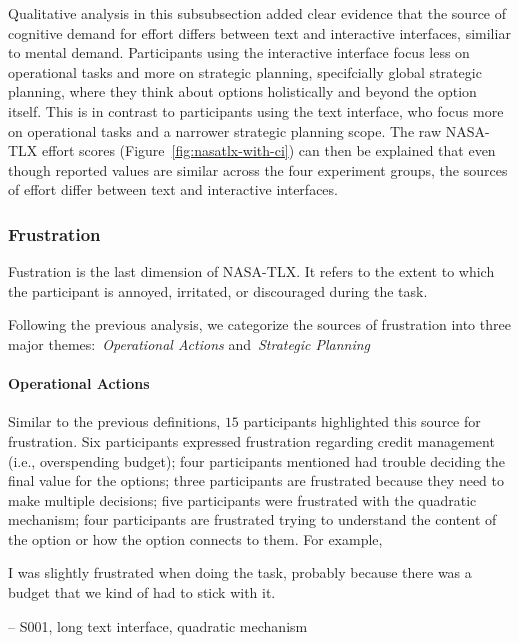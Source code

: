 Qualitative analysis in this subsubsection added clear evidence that the source of cognitive demand for effort differs between text and interactive interfaces, similiar to mental demand. Participants using the interactive interface focus less on operational tasks and more on strategic planning, specifcially global strategic planning, where they think about options holistically and beyond the option itself. This is in contrast to participants using the text interface, who focus more on operational tasks and a narrower strategic planning scope. The raw NASA-TLX effort scores (Figure~\ref{fig:nasatlx-with-ci}) can then be explained that even though reported values are similar across the four experiment groups, the sources of effort differ between text and interactive interfaces.


\subsubsection{Frustration}
Fustration is the last dimension of NASA-TLX. It refers to the extent to which the participant is annoyed, irritated, or discouraged during the task.

Following the previous analysis, we categorize the sources of frustration into three major themes:~\textit{Operational Actions} and~\textit{Strategic Planning}

\paragraph{Operational Actions} Similar to the previous definitions, $15$ participants highlighted this source for frustration. Six participants expressed frustration regarding credit management (i.e., overspending budget); four participants mentioned had trouble deciding the final value for the options; three participants are frustrated because they need to make multiple decisions; five participants were frustrated with the quadratic mechanism; four participants are frustrated trying to understand the content of the option or how the option connects to them. For example, 

\begin{displayquote}
I was slightly frustrated when doing the task, probably because there was a budget that we kind of had to stick with it.

\noindent \hfill -- S001, long text interface, quadratic mechanism
\end{displayquote}

